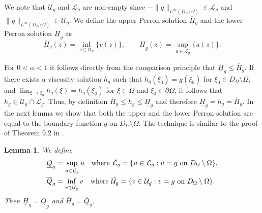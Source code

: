 \documentclass[11pt]{article}
\providecommand{\RnpO}{D_{\Omega}\setminus \Omega}
\providecommand{\ug}{\mathcal{U}_g}
\providecommand{\ups}{\overline{H}_g}
\providecommand{\lps}{\underline{H}_g}
\providecommand{\lcg}{\mathcal{L}_g}
\newtheorem{lem}[thm]{Lemma}
\numberwithin{equation}{section}
\theoremstyle{definition}
\begin{document}
We note that $\ug$ and $\lcg$ are non-empty since $-\|g\|_{L^{\infty}(\RnpO)} \in \lcg$ and $\|g\|_{L^{\infty}(\RnpO)} \in \ug$. We define the upper Perron solution $\ups$ and the lower Perron solution $\lps$ as
\begin{equation*}
    \ups(z) = \inf_{v \in \ug} \{ v(z)\}, \quad \quad \lps(z) = \sup_{u \in \lcg} \{ u(z) \}.
\end{equation*}

 For $0<\alpha <1$ it follows directly from the comparison principle that $\lps \leq \ups$. If there exists a viscosity solution $h_g$ such that $h_g(\xi_0)=g(\xi_0)$ for $\xi_0 \in \RnpO$, and $\lim_{\xi \to \xi_0} h_g(\xi) = h_g(\xi_0)$ for $\xi \in \Omega$ and $\xi_0 \in \partial \Omega$, it follows that $h_g \in \mathcal{U}_g \cap \mathcal{L}_g$. Thus, by definition $\ups \leq h_g \leq \lps$ and therefore $\lps = h_g=\ups$. In the next lemma we show that both the upper and the lower Perron solution are equal to the boundary function $g$ on $\RnpO$. The technique is similar to the proof of Theorem 9.2 in \cite{bbk2024perron}.
\begin{lem}\label{lem:Perronbdy}
    We define 
    \begin{align*}
        \underline{Q}_g &= \sup_{u \in \tilde{\mathcal{L}}_g} u \quad  \textup{where } \tilde{\mathcal{L}}_g = \{ u \in \lcg : u=g \textup{ on } \RnpO\},\\
        \overline{Q}_g &= \inf_{v \in \tilde{\mathcal{U}}_g} v \quad  \textup{where } \tilde{\mathcal{U}}_g = \{ v \in \ug : v=g \textup{ on } \RnpO\}.
    \end{align*}
    Then $\lps = \underline{Q}_g$ and $\ups = \overline{Q}_g$.
\end{lem}
\end{document}
